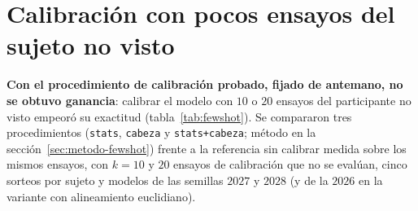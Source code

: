 \section{Calibración con pocos ensayos del sujeto no visto}
\label{sec:fewshot}

\textbf{Con el procedimiento de calibración probado, fijado de antemano, no se obtuvo ganancia}: calibrar el
modelo con $10$ o $20$ ensayos del participante no visto empeoró su exactitud (tabla~\ref{tab:fewshot}).
Se compararon tres procedimientos (\texttt{stats}, \texttt{cabeza} y \texttt{stats+cabeza}; método en la
sección~\ref{sec:metodo-fewshot}) frente a la referencia sin calibrar medida sobre los mismos ensayos, con
$k = 10$ y $20$ ensayos de calibración que no se evalúan, cinco sorteos por sujeto y modelos de las semillas
$2027$ y $2028$ (y de la $2026$ en la variante con alineamiento euclidiano).

